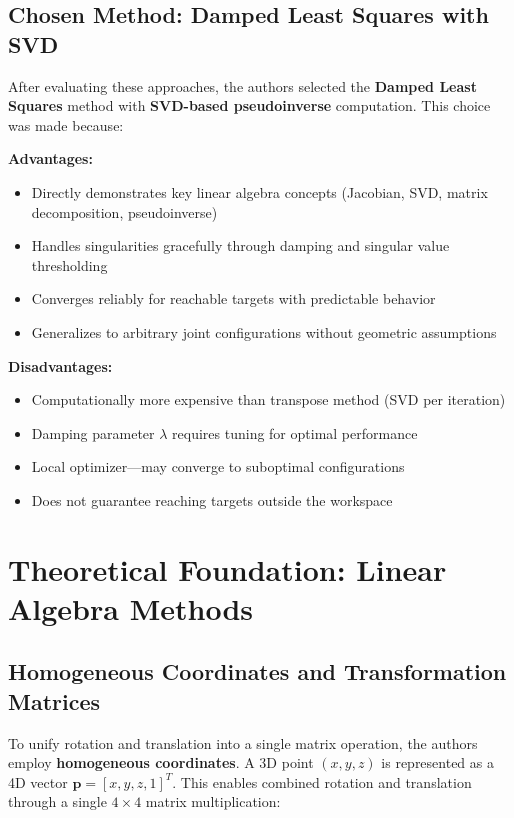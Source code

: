 \documentclass[11pt]{article}
\begin{document}
\subsection{Chosen Method: Damped Least Squares with SVD}

After evaluating these approaches, the authors selected the \textbf{Damped Least Squares} method with \textbf{SVD-based pseudoinverse} computation. This choice was made because:

\textbf{Advantages:}
\begin{itemize}[nosep]
    \item Directly demonstrates key linear algebra concepts (Jacobian, SVD, matrix decomposition, pseudoinverse)
    \item Handles singularities gracefully through damping and singular value thresholding
    \item Converges reliably for reachable targets with predictable behavior
    \item Generalizes to arbitrary joint configurations without geometric assumptions
\end{itemize}

\textbf{Disadvantages:}
\begin{itemize}[nosep]
    \item Computationally more expensive than transpose method (SVD per iteration)
    \item Damping parameter $\lambda$ requires tuning for optimal performance
    \item Local optimizer---may converge to suboptimal configurations
    \item Does not guarantee reaching targets outside the workspace
\end{itemize}

\section{Theoretical Foundation: Linear Algebra Methods}

\subsection{Homogeneous Coordinates and Transformation Matrices}

To unify rotation and translation into a single matrix operation, the authors employ \textbf{homogeneous coordinates}. A 3D point $(x, y, z)$ is represented as a 4D vector $\mathbf{p} = [x, y, z, 1]^T$. This enables combined rotation and translation through a single $4 \times 4$ matrix multiplication:
\end{document}
